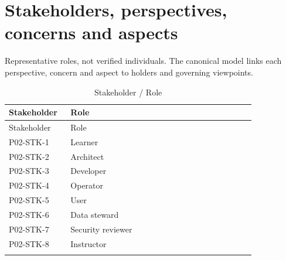 \documentclass[10pt,letterpaper]{article}
\begin{document}
\section{Stakeholders, perspectives, concerns and aspects}
Representative roles, not verified individuals. The canonical model links each perspective, concern and aspect to holders and governing viewpoints.
\begin{longtable}{@{}>{\raggedright\arraybackslash}p{0.23\linewidth}>{\raggedright\arraybackslash}p{0.69\linewidth}@{}}
\caption{Stakeholder / Role}\\
\toprule Stakeholder & Role\\\midrule\endfirsthead
\toprule Stakeholder & Role\\\midrule\endhead
P02-STK-1 & Learner\\\addlinespace
P02-STK-2 & Architect\\\addlinespace
P02-STK-3 & Developer\\\addlinespace
P02-STK-4 & Operator\\\addlinespace
P02-STK-5 & User\\\addlinespace
P02-STK-6 & Data steward\\\addlinespace
P02-STK-7 & Security reviewer\\\addlinespace
P02-STK-8 & Instructor\\\addlinespace
\bottomrule\end{longtable}
\end{document}
